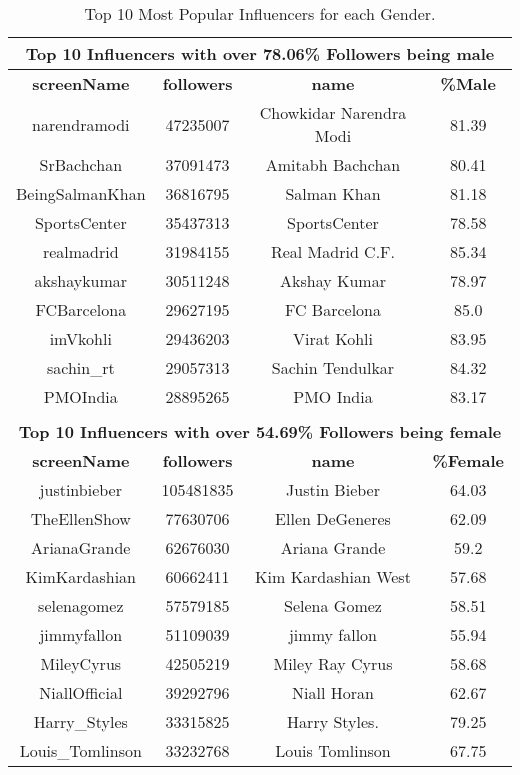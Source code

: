 \begin{table}
\small
\caption[Top Influencers with male vs. female audience]{Top 10 Most Popular Influencers for each Gender.}
\label{table_4_app2}
\begin{center}
\begin{tabular}{|c|c|c|c|}
\multicolumn{4}{c}{\bfseries Top 10 Influencers with over 78.06\% Followers being male}\\
\hline
\bfseries screenName & \bfseries followers & \bfseries name & \bfseries {\%}Male\\
\hline
narendramodi & 47235007 &Chowkidar Narendra Modi& 81.39 \\
\hline
SrBachchan & 37091473 &Amitabh Bachchan& 80.41\\
\hline
BeingSalmanKhan & 36816795 & Salman Khan & 81.18\\
\hline
SportsCenter & 35437313 & SportsCenter & 78.58\\
\hline
realmadrid & 31984155 & Real Madrid C.F. & 85.34\\
\hline
akshaykumar & 30511248 & Akshay Kumar  & 78.97\\
\hline
FCBarcelona & 29627195 & FC Barcelona & 85.0\\
\hline
imVkohli & 29436203 & Virat Kohli & 83.95\\
\hline
sachin{\_}rt & 29057313 & Sachin Tendulkar & 84.32\\
\hline
PMOIndia & 28895265 & PMO India & 83.17\\
\hline
\multicolumn{4}{c}{}\\
\multicolumn{4}{c}{\bfseries Top 10 Influencers with over 54.69\% Followers being female}\\
\hline
\bfseries screenName & \bfseries followers & \bfseries name & \bfseries{\%}Female\\
\hline
justinbieber & 105481835 & Justin Bieber & 64.03\\
\hline
TheEllenShow & 77630706 & Ellen DeGeneres &62.09\\
\hline
ArianaGrande & 62676030 & Ariana Grande & 59.2\\
\hline
KimKardashian & 60662411 &Kim Kardashian West& 57.68\\
\hline
selenagomez & 57579185 & Selena Gomez & 58.51\\
\hline
jimmyfallon & 51109039& jimmy fallon & 55.94\\
\hline
MileyCyrus & 42505219 & Miley Ray Cyrus & 58.68\\
\hline
NiallOfficial & 39292796 & Niall Horan & 62.67\\
\hline
Harry{\_}Styles & 33315825 & Harry Styles. & 79.25\\
\hline
Louis{\_}Tomlinson & 33232768 & Louis Tomlinson & 67.75\\
\hline
\end{tabular}
\end{center}
\end{table}

